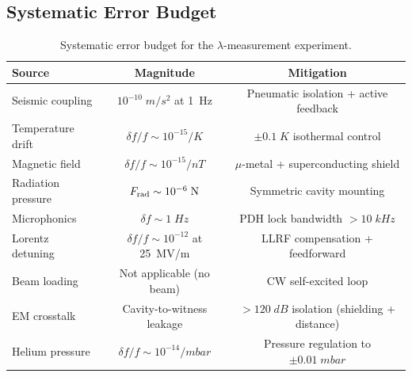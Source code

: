 \documentclass[aps,prd,twocolumn,superscriptaddress,floatfix,nofootinbib]{revtex4-2}
\begin{document}
\subsection{Systematic Error Budget}\label{sec:systematics}

\begin{table}[h]
\caption{Systematic error budget for the $\lambda$-measurement experiment.}
\label{tab:systematics}
\begin{ruledtabular}
\begin{tabular}{lcc}
Source & Magnitude & Mitigation \\
\hline
Seismic coupling & $10^{-10}\;\si{m/s^2}$ at 1~Hz &
Pneumatic isolation + active feedback \\
Temperature drift & $\delta f/f \sim 10^{-15}/\si{K}$ &
$\pm 0.1\;\si{K}$ isothermal control \\
Magnetic field & $\delta f/f \sim 10^{-15}/\si{nT}$ &
$\mu$-metal + superconducting shield \\
Radiation pressure & $F_{\rm rad} \sim 10^{-6}\;\si{N}$ &
Symmetric cavity mounting \\
Microphonics & $\delta f \sim 1\;\si{Hz}$ &
PDH lock bandwidth $> 10\;\si{kHz}$ \\
Lorentz detuning & $\delta f/f \sim 10^{-12}$ at 25~MV/m &
LLRF compensation + feedforward \\
Beam loading & Not applicable (no beam) &
CW self-excited loop \\
EM crosstalk & Cavity-to-witness leakage &
$> 120\;\si{dB}$ isolation (shielding + distance) \\
Helium pressure & $\delta f/f \sim 10^{-14}/\si{mbar}$ &
Pressure regulation to $\pm 0.01\;\si{mbar}$ \\
\end{tabular}
\end{ruledtabular}
\end{table}
\end{document}
